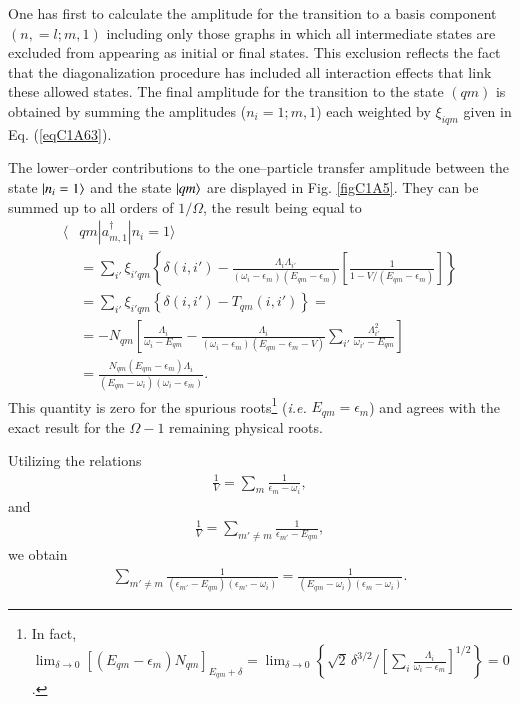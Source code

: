 One has first to calculate the amplitude for the transition to a basis component $(n, = l; m, 1)$ including only those graphs in which all intermediate states are excluded from appearing as initial or final states. This exclusion reflects the fact that the diagonalization procedure has included all interaction effects that link these allowed states. The final amplitude for the transition to the state $(qm)$ is obtained by summing the amplitudes  ($n_i=1;m,1$) each weighted by  $\xi_{iqm}$ given in Eq. (\ref{eqC1A63}). 

The lower--order contributions to the one--particle transfer amplitude between the state $|{n_i=1} \rangle$ and the state $|{qm} \rangle$ are displayed in Fig. \ref{figC1A5}. They can be summed up to all orders of $1/\Omega$, the result being equal to 
  \begin{align}\label{eqC1A73} 
   \nonumber \langle & qm|a^\dagger_{m,1}|n_i=1\rangle\\
\nonumber &=\sum_{i'}\xi_{i'qm}\left\{\delta(i,i')-\frac{\Lambda_i\Lambda_{i'}}{(\omega_i-\epsilon_m)(E_{qm}-\epsilon_m)}\left[\frac{1}{1-V/(E_{qm}-\epsilon_m)}\right]\right\}\\
\nonumber &=\sum_{i'}\xi_{i'qm}\left\{\delta(i,i')-T_{qm}(i,i')\right\}=\\
\nonumber & =-N_{qm}\left[\frac{\Lambda_i}{\omega_i-E_{qm}}-\frac{\Lambda_i}{(\omega_i-\epsilon_m)(E_{qm}-\epsilon_m-V)}\sum_{i'}\frac{\Lambda_{i'}^2}{\omega_{i'}-E_{qm}}\right]\\
&=\frac{N_{qm}(E_{qm}-\epsilon_m)\Lambda_i}{(E_{qm}-\omega_i)(\omega_i-\epsilon_m)}.
\end{align} 
This quantity is zero for the spurious roots\footnote{In fact, $\lim_{\delta\to0}[(E_{qm}-\epsilon_m)N_{qm}]_{E_{qm}+\delta}=\lim_{\delta\to0}\left\{\sqrt{2}\,\delta^{3/2}/[\sum_i\frac{\Lambda_i}{\omega_i-\epsilon_m}]^{1/2}\right\}=0$.} (\textit{i.e.} $E_{qm}=\epsilon_m$) and agrees with the exact result for the $\Omega-1$ remaining physical roots. 


Utilizing the relations
  \begin{align}\label{eqC1A74} 
  \frac{1}{V}=\sum_m\frac{1}{\epsilon_m-\omega_i},
    \end{align}  
and  
  \begin{align}\label{eqC1A75} 
   \frac{1}{V}=\sum_{m'\neq m}\frac{1}{\epsilon_{m'}-E_{qm}},
    \end{align} 
we  obtain  
  \begin{align}\label{eqC1A76} 
   \sum_{m'\neq m}\frac{1}{(\epsilon_{m'}-E_{qm})(\epsilon_{m'}-\omega_i)}=\frac{1}{(E_{qm}-\omega_i)(\epsilon_m-\omega_i)}.
    \end{align} 

